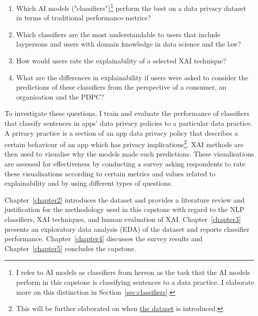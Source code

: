 \begin{enumerate}
  \item Which AI models ("classifiers")\footnote{I refer to AI models as classifiers from hereon as the task that the AI models perform in this capstone is classifying sentences to a data practice. I elaborate more on this distinction in Section~\ref{sec:classifiers}.} perform the best on a data privacy dataset in terms of traditional performance metrics?
  \item Which classifiers are the most understandable to users that include laypersons and users with domain knowledge in data science and the law?
  \item How would users rate the explainability of a selected XAI technique?
  \item What are the differences in explainability if users were asked to consider the predictions of these classifiers from the perspective of a consumer, an organisation and the PDPC?
\end{enumerate}

To investigate these questions, I train and evaluate the performance of classifiers that classify sentences in apps' data privacy policies to a particular data practice. A privacy practice is a section of an app data privacy policy that describes a certain behaviour of an app which has privacy implications\footnote{This will be further elaborated on when \hyperref[app350_corpus]{the dataset} is introduced.}. XAI methods are then used to visualise why the models made such predictions. These visualisations are assessed for effectiveness by conducting a survey asking respondents to rate these visualisations according to certain metrics and values related to explainability and by using different types of questions.

Chapter~\ref{chapter2} introduces the dataset and provides a literature review and justification for the methodology used in this capstone with regard to the NLP classifiers, XAI techniques, and human evaluation of XAI. Chapter~\ref{chapter3} presents an exploratory data analysis (EDA) of the dataset and reports classifier performance. Chapter~\ref{chapter4} discusses the survey results and Chapter~\ref{chapter5} concludes the capstone.